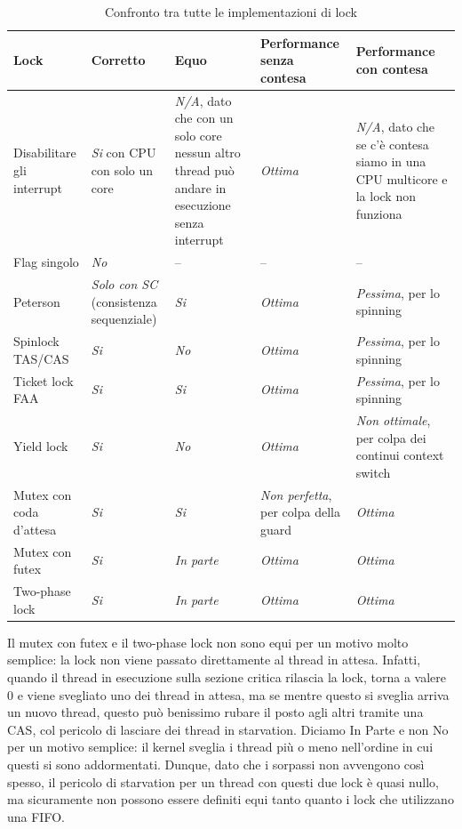 \documentclass[11pt, a4paper, titlepage, oneside]{scrbook}
\begin{document}
\begin{table}[H]
\centering
\begin{tabular}{|p{}|p{}|p{}|p{}|p{}|}
\hline
\textbf{Lock} & \textbf{Corretto} & \textbf{Equo} & \textbf{Performance senza contesa} & \textbf{Performance con contesa} \\
\hline
Disabilitare gli interrupt & \textit{Si} con CPU con solo un core & \textit{N/A}, dato che con un solo core nessun altro thread può andare in esecuzione senza interrupt & \textit{Ottima} & \textit{N/A}, dato che se c'è contesa siamo in una CPU multicore e la lock non funziona \\
\hline
Flag singolo & \textit{No} & -- & -- & -- \\
\hline
Peterson & \textit{Solo con SC} (consistenza sequenziale) & \textit{Si} & \textit{Ottima} & \textit{Pessima}, per lo spinning \\
\hline
Spinlock TAS/CAS & \textit{Si} & \textit{No} & \textit{Ottima} & \textit{Pessima}, per lo spinning \\
\hline
Ticket lock FAA & \textit{Si} & \textit{Si} & \textit{Ottima} & \textit{Pessima}, per lo spinning \\
\hline
Yield lock & \textit{Si} & \textit{No} & \textit{Ottima} & \textit{Non ottimale}, per colpa dei continui context switch \\
\hline
Mutex con coda d'attesa & \textit{Si} & \textit{Si} & \textit{Non perfetta}, per colpa della guard & \textit{Ottima} \\
\hline
Mutex con futex & \textit{Si} & \textit{In parte} & \textit{Ottima} & \textit{Ottima} \\
\hline
Two-phase lock & \textit{Si} & \textit{In parte} & \textit{Ottima} & \textit{Ottima} \\
\hline
\end{tabular}
\caption{Confronto tra tutte le implementazioni di lock}
\end{table}

Il mutex con futex e il two-phase lock non sono equi per un motivo molto semplice: la lock non viene passato direttamente al thread in attesa. Infatti, quando il thread in esecuzione sulla sezione critica rilascia la lock,  torna a valere 0 e viene svegliato uno dei thread in attesa, ma se mentre questo si sveglia arriva un nuovo thread, questo può benissimo rubare il posto agli altri tramite una CAS, col pericolo di lasciare dei thread in starvation. Diciamo In Parte e non No per un motivo semplice: il kernel sveglia i thread più o meno nell'ordine in cui questi si sono addormentati. Dunque, dato che i sorpassi non avvengono così spesso, il pericolo di starvation per un thread con questi due lock è quasi nullo, ma sicuramente non possono essere definiti equi tanto quanto i lock che utilizzano una FIFO.
\end{document}

